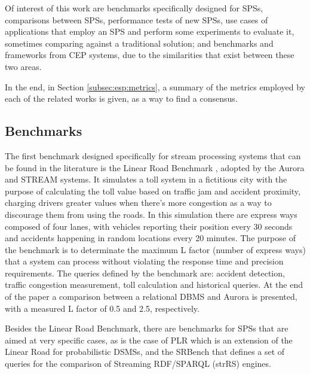 \documentclass[ppgc,diss,english]{iiufrgs}
\begin{document}
Of interest of this work are benchmarks specifically designed for SPSs, comparisons between SPSs, performance tests of new SPSs, use cases of applications that employ an SPS and perform some experiments to evaluate it, sometimes comparing against a traditional solution; and benchmarks and frameworks from CEP systems, due to the similarities that exist between these two areas.

In the end, in Section \ref{subsec:esp:metrics}, a summary of the metrics employed by each of the related works is given, as a way to find a consensus.

\subsection{Benchmarks}
\label{subsec:esp:benchmarks}

The first benchmark designed specifically for stream processing systems that can be found in the literature is the Linear Road Benchmark \cite{arasu2004linear}, adopted by the Aurora \cite{abadi2003aurora} and STREAM \cite{arasu2004stream} systems. It simulates a toll system in a fictitious city with the purpose of calculating the toll value based on traffic jam and accident proximity, charging drivers greater values when there's more congestion as a way to discourage them from using the roads. In this simulation there are express ways composed of four lanes, with vehicles reporting their position every 30 seconds and accidents happening in random locations every 20 minutes. The purpose of the benchmark is to determinate the maximum L factor (number of express ways) that a system can process without violating the response time and precision requirements. The queries defined by the benchmark are: accident detection, traffic congestion measurement, toll calculation and historical queries. At the end of the paper a comparison between a relational DBMS and Aurora is presented, with a measured L factor of 0.5 and 2.5, respectively.


Besides the Linear Road Benchmark, there are benchmarks for SPSs that are aimed at very specific cases, as is the case of PLR \cite{karachi2012plr} which is an extension of the Linear Road for probabilistic DSMSs, and the SRBench \cite{zhang2012srbench} that defines a set of queries for the comparison of Streaming RDF/SPARQL (strRS) engines.
\end{document}
